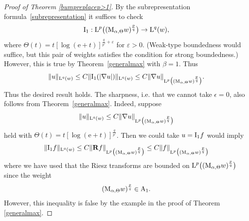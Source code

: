 \documentclass[11pt, a4paper, reqno]{amsart}
\newcommand{\A}{\textup A}
\newcommand{\ep}{\epsilon}
\newcommand{\Lup}{\textup{L}}
\theoremstyle{definition}
\theoremstyle{remark}
\begin{document}
\begin{proof}[Proof of Theorem \ref{bumpreplacep>1}] By the subrepresentation formula~\eqref{subrepresentation} it suffices to check
\begin{equation*}\label{I1bdd}
\textup I_1:\Lup^p\big((\textup{M}_{\alpha,\Theta}w)^{\frac{p}{q}}\big)\to \Lup^q(w),
\end{equation*}
where $\Theta(t)=t[\log(\mathrm e+t)]^{\frac{q}{p'}+\varepsilon}$ for $\varepsilon>0$. (Weak-type boundedness would suffice, but this pair of weights satisfies the condition for strong boundedness.) However, this is true by Theorem~\ref{generalmax} with $\beta=1$. Thus 
\[
\|u\|_{\Lup^q(w)}
\le C\|\textup I_1(|\nabla u|)\|_{\Lup^q(w)}
\le C\|\nabla u\|_{\Lup^p\big((\textup{M}_{\alpha,\Theta}w)^{\frac{p}{q}}\big)}.
\]
Thus the desired result holds.  The sharpness, i.e. that we cannot take $\ep=0$, also follows from Theorem~\ref{generalmax}.  Indeed, suppose 
$$\|u\|_{\Lup^q(w)}
\le C\|\nabla u\|_{\Lup^p\big((\textup{M}_{\alpha,\Theta}w)^{\frac{p}{q}}\big)}$$
held with $\Theta(t)=t[\log(\mathrm e+t)]^{\frac{q}{p'}}$.  Then we could take $u=\textup I_1f$ would imply
$$\|\textup I_1f\|_{\Lup^q(w)}
\le C\|\mathbf Rf\|_{\Lup^p\big((\textup{M}_{\alpha,\Theta}w)^{\frac{p}{q}}\big)}\leq C\|f\|_{\Lup^p\big((\textup{M}_{\alpha,\Theta}w)^{\frac{p}{q}}\big)}$$
where we have used that the Riesz transforms are bounded on $\Lup^p\big((\textup{M}_{\alpha,\Theta}w)^{\frac{p}{q}}\big)$ since the weight
$$(\textup{M}_{\alpha,\Theta}w)^{\frac{p}{q}}\in\A_1.$$
However, this inequality is false by the example in the proof of Theorem \ref{generalmax}.
\end{proof}
\end{document}
